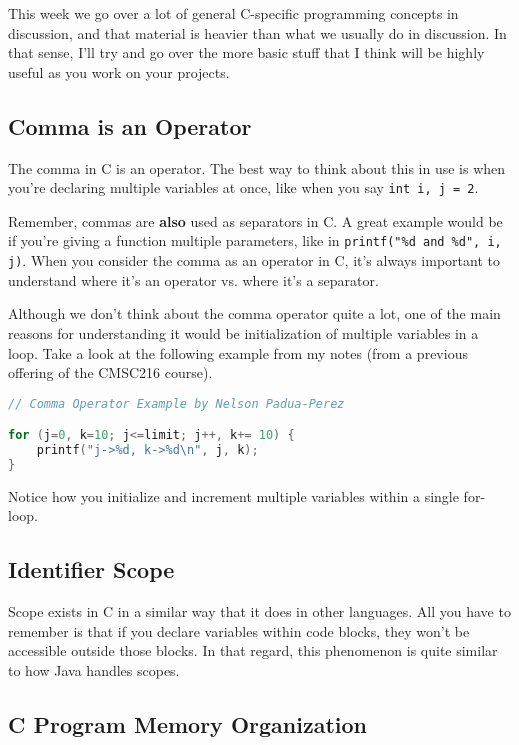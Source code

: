 \documentclass[english, 10pt]{article}
\begin{document}
This week we go over a lot of general C-specific programming concepts in discussion, and that material is heavier than what we usually do in discussion. In that sense, I'll try and go over the more basic stuff that I think will be highly useful as you work on your projects.

\subsection{Comma is an Operator}

The comma in C is an operator. The best way to think about this in use is when you're declaring multiple variables at once, like when you say \texttt{int i, j = 2}.

Remember, commas are \textbf{also} used as separators in C. A great example would be if you're giving a function multiple parameters, like in \texttt{printf("\%d and \%d", i, j)}. When you consider the comma as an operator in C, it's always important to understand where it's an operator vs. where it's a separator. 

Although we don't think about the comma operator quite a lot, one of the main reasons for understanding it would be initialization of multiple variables in a loop. Take a look at the following example from my notes (from a previous offering of the CMSC216 course).

{\centering
\begin{lstlisting}[language=C]
// Comma Operator Example by Nelson Padua-Perez

for (j=0, k=10; j<=limit; j++, k+= 10) {
	printf("j->%d, k->%d\n", j, k);
} 
\end{lstlisting}
}

Notice how you initialize and increment multiple variables within a single for-loop.


\subsection{Identifier Scope}

Scope exists in C in a similar way that it does in other languages. All you have to remember is that if you declare variables within code blocks, they won't be accessible outside those blocks. In that regard, this phenomenon is quite similar to how Java handles scopes.

\subsection{C Program Memory Organization}
\end{document}
